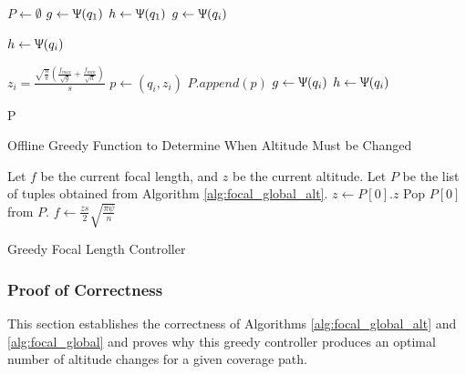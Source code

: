 \documentclass[conference]{IEEEtran}
\theoremstyle{plain}%
\begin{document}
\begin{algorithm}
\begin{algorithmic}[1]

\STATE $P \leftarrow \emptyset$ 
\STATE $g \leftarrow \Uppsi(q_1)$ 
\STATE $h \leftarrow \Uppsi(q_1)$
\STATE $g \leftarrow \Uppsi(q_i)$
\ENDIF

\STATE $h \leftarrow \Uppsi(q_i)$
\ENDIF

\STATE $z_i = \frac{ \sqrt{\frac{n}{\pi}} \left( \frac{f_{max}}{\sqrt{g}} + \frac{f_{min}}{\sqrt{h}} \right) }{s}$ 
\STATE $p \leftarrow (q_i, z_i)$
\STATE $P.append(p)$
\STATE $g \leftarrow \Uppsi(q_i)$
\STATE $h \leftarrow \Uppsi(q_i)$
\ENDIF

\ENDFOR
\RETURN P
\end{algorithmic}
\caption{Offline Greedy Function to Determine When Altitude Must be Changed}
\label{alg:focal_global_alt}
\end{algorithm}

\begin{algorithm}
\begin{algorithmic}[1]

\STATE Let $f$ be the current focal length, and $z$ be the current altitude. Let $P$ be the list of tuples obtained from Algorithm \ref{alg:focal_global_alt}.
\STATE $z \leftarrow P[0].z$
\STATE Pop $P[0]$ from $P$.
\ENDIF
\STATE $f \leftarrow \frac{zs}{2} \sqrt{\frac{\pi\psi}{n}}$
\ENDFOR

\end{algorithmic}
\caption{Greedy Focal Length Controller}
\label{alg:focal_global}
\end{algorithm}

\subsubsection{Proof of Correctness}
This section establishes the correctness of Algorithms \ref{alg:focal_global_alt} and \ref{alg:focal_global} and proves why this greedy controller produces an optimal number of altitude changes for a given coverage path.
\end{document}
